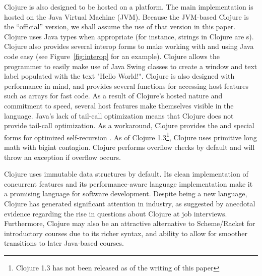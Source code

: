 \documentclass[12pt]{article}
\begin{document}
Clojure is also designed to be hosted on a platform. The main
implementation is hosted on the Java Virtual Machine (JVM). Because the
JVM-based Clojure is the ``official'' version, we shall assume the use of that version in
this paper. Clojure uses Java types when appropriate (for instance,
strings in Clojure are \jlstring s). Clojure also provides several interop forms
to make working with and using Java code easy (see Figure~\ref{fig:interop} for
an example). Clojure allows the programmer to easily make use of Java Swing classes to create a window and text label populated with the text "Hello World!".
Clojure is also designed with
performance in mind, and provides several functions for accessing host features
such as arrays for fast code. As a result of Clojure's hosted nature and commitment to
speed, several host features make themselves visible in the
language. Java's lack of tail-call optimization means that Clojure does not
provide tail-call optimization. As a workaround, Clojure provides the
 and  special forms for optimized self-recursion \cite{halloway:clojure}. As of
Clojure 1.3\footnote{Clojure 1.3 has not been released as of the writing of this paper}, Clojure uses
primitive long math with bigint contagion. Clojure performs overflow checks by
default and will throw an exception if overflow occurs.

Clojure uses immutable data structures by default. Its clean 
implementation of concurrent features and its performance-aware 
language implementation make it a promising language for software
development. Despite being a new language, Clojure has generated 
significant attention in industry, as suggested by anecdotal evidence regarding the rise in questions
about Clojure at job interviews. 
Furthermore, Clojure may also be an attractive alternative
to Scheme/Racket for introductory courses due to its richer syntax, and
ability to allow for smoother transitions to later Java-based courses. 
\end{document}
